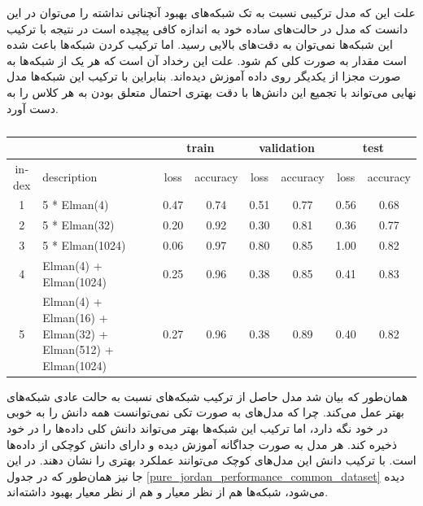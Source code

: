 \documentclass[12pt, a4paper]{article}
\begin{document}
علت این که مدل ترکیبی  نسبت به تک شبکه‌های  بهبود آنچنانی نداشته را می‌توان در این
دانست که مدل  در حالت‌های ساده خود به اندازه کافی پیچیده است در نتیجه با ترکیب این شبکه‌ها نمی‌توان
به دقت‌های بالایی رسید. اما ترکیب کردن شبکه‌ها باعث شده است مقدار  به صورت کلی کم شود. علت این رخداد
آن است که هر یک از شبکه‌ها به صورت مجزا از یکدیگر روی داده‌ آموزش دیده‌اند. بنابراین با ترکیب این شبکه‌ها
مدل نهایی می‌تواند با تجمیع این دانش‌ها با دقت بهتری احتمال متعلق بودن به هر کلاس را به دست آورد.

\begin{latin}
\begin{table}[h]
    \centering
    \caption{}
    \label{pure_elman_performance_common_dataset}
    \begin{tabular}{c|p{3cm}|c|c|c|c|c|c}
        & & \multicolumn{2}{c|}{\cellcolor{teal!30}train} & \multicolumn{2}{c|}{\cellcolor{teal!30}validation} &  \multicolumn{2}{c}{\cellcolor{teal!30}test} \\ \hline
        index & description & loss & accuracy & loss & accuracy & loss & accuracy\\ \hline
        1 & 5 * Elman(4) & 0.47 & 0.74 & 0.51 & 0.77 & 0.56 & 0.68 \\
        2 & 5 * Elman(32) & 0.20 & 0.92 & 0.30 & 0.81 & 0.36 & 0.77 \\
        3 & 5 * Elman(1024) & 0.06 & 0.97 & 0.80 & 0.85 & 1.00 & 0.82 \\
        4 & Elman(4) + Elman(1024) & 0.25 & 0.96 & 0.38 & 0.85 & 0.41 & 0.83 \\
        5 & Elman(4) + Elman(16) + Elman(32) + Elman(512) + Elman(1024) & 0.27 & 0.96 & 0.38 & 0.89 & 0.40 & 0.82 \\
    \end{tabular}
\end{table}
\end{latin}

همان‌طور که بیان شد مدل حاصل از ترکیب شبکه‌های  نسبت به حالت عادی شبکه‌های  بهتر عمل می‌کند.
چرا که مدل‌های  به صورت تکی نمی‌توانست همه دانش را به خوبی در خود نگه دارد، اما ترکیب این شبکه‌ها
بهتر می‌تواند دانش کلی داده‌ها را در خود ذخیره کند. هر مدل به صورت جداگانه آموزش دیده و دارای دانش کوچکی از
داده‌ها است. با ترکیب دانش این مدل‌های کوچک می‌توانند عملکرد بهتری را نشان دهند. در این جا نیز همان‌طور که در جدول
\ref{pure_jordan_performance_common_dataset} دیده می‌شود، شبکه‌ها هم از نظر معیار  و هم از نظر
معیار  بهبود داشته‌اند.
\end{document}
